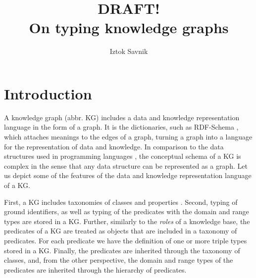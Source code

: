 \documentclass[runningheads]{llncs}
\begin{document}
\title{DRAFT! \\ On typing knowledge graphs}

\author{Iztok Savnik} 



\maketitle

\begin{abstract}
  
\end{abstract}


\thispagestyle{headings}




\section{Introduction}

A knowledge graph (abbr. KG) includes a data and knowledge
representation language in the form of a graph. It is the
dictionaries, such as RDF-Schema \cite{rdfschema}, which attaches
meanings to the edges of a graph, turning a graph into a language for
the representation of data and knowledge. In comparison to the data
structures used in programming languages
\cite{Pierce2002,Hindley1997}, the conceptual schema of a KG is
complex in the sense that any data structure can be represented as a
graph. Let us depict some of the features of the data and knowledge
representation language of a KG.

First, a KG includes taxonomies of classes and properties
\cite{Baader2002}. Second, typing of ground identifiers, as well as
typing of the predicates with the domain and range types are stored in
a KG. Further, similarly to the \emph{roles} \cite{Brachman1985} of a
knowledge base, the predicates of a KG are treated as objects that are
included in a taxonomy of predicates. For each predicate we have the
definition of one or more triple types stored in a KG. Finally, the
predicates are inherited through the taxonomy of classes, and, from
the other perspective, the domain and range types of the predicates
are inherited through the hierarchy of predicates.
\end{document}
